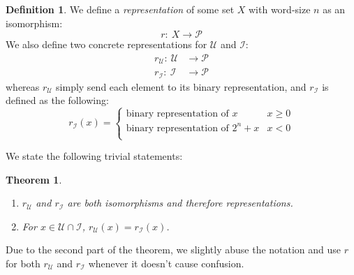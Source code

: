 \documentclass{amsart}
\theoremstyle{plain}
\newtheorem{theorem}{Theorem}[section]
\theoremstyle{definition}
\newtheorem{definition}{Definition}[section]
\theoremstyle{definition}
\theoremstyle{remark}
\begin{document}
\begin{definition}
    We define a \emph{representation} of some set \(X\) with word-size \(n\) as an isomorphism: 
    \begin{equation*}
        r: \ X \rightarrow \mathcal{P}
    \end{equation*}
    We also define two concrete representations for \(\mathcal{U}\) and \(\mathcal{I}\):
    \begin{align*}
        r_{\mathcal{U}}: \ \mathcal{U}&\rightarrow \mathcal{P} \\
        r_{\mathcal{I}}: \ \mathcal{I}&\rightarrow \mathcal{P}
    \end{align*}
    whereas \(r_{\mathcal{U}}\) simply send each element to its binary representation, and \(r_{\mathcal{I}}\) is defined as the following:
    \begin{equation*}
        r_{\mathcal{I}} \left(x\right)= 
        \begin{cases}
            \text{binary representation of }x & x \geq 0 \\
            \text{binary representation of }2^{n} + x & x < 0 \\
        \end{cases}
    \end{equation*}
\end{definition}
We state the following trivial statements:
\begin{theorem}
   \begin{enumerate}
       \item \(r_{\mathcal{U}}\) and \(r_{\mathcal{I}}\) are both isomorphisms and therefore representations.
       \item For \(x \in \mathcal{U}\cap \mathcal{I}\), \(r_{\mathcal{U}}\left(x\right) = r_{\mathcal{I}} \left(x\right)\).
   \end{enumerate} 
\end{theorem}
Due to the second part of the theorem, we slightly abuse the notation and use \(r\) for both \(r_{\mathcal{U}}\) and \(r_{\mathcal{I}}\) whenever it doesn't cause confusion.
\end{document}
